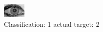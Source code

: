 \begin{figure}[h!]
\begin{center}
\includegraphics[width=0.60\columnwidth]{figures/ID1990_class_1_target_2.png}
\end{center}
\caption{ Classification: 1 actual target: 2}
\label{fig:ID1990_class_1_target_2}
\end{figure}
